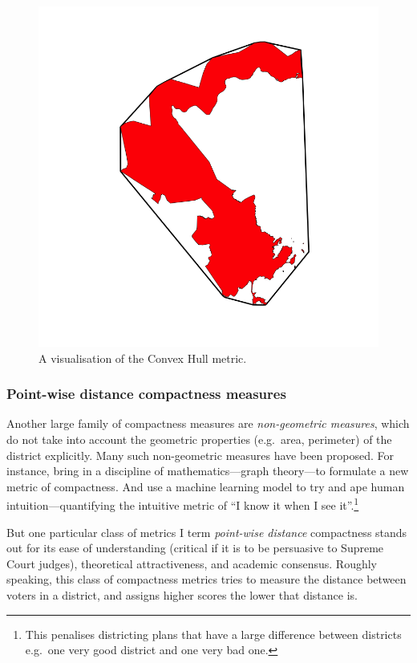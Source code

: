\documentclass[]{article}
\begin{document}
\begin{figure}
\centering
\includegraphics{img/ch.png}
\caption{A visualisation of the Convex Hull metric.}
\end{figure}

\hypertarget{point-wise-distance-compactness-measures}{%
\subsubsection{Point-wise distance compactness
measures}\label{point-wise-distance-compactness-measures}}

Another large family of compactness measures are \emph{non-geometric
measures}, which do not take into account the geometric properties
(e.g.~area, perimeter) of the district explicitly. Many such
non-geometric measures have been proposed. For instance, \cite{dc2016}
bring in a discipline of mathematics---graph theory---to formulate a new
metric of compactness. And \cite{kingwp} use a machine learning model to
try and ape human intuition---quantifying the intuitive metric of ``I
know it when I see it''.\footnote{This penalises districting plans that
  have a large difference between districts e.g.~one very good district
  and one very bad one.}

But one particular class of metrics I term \emph{point-wise distance}
compactness stands out for its ease of understanding (critical if it is
to be persuasive to Supreme Court judges), theoretical attractiveness,
and academic consensus. Roughly speaking, this class of compactness
metrics tries to measure the distance between voters in a district, and
assigns higher scores the lower that distance is.
\end{document}
